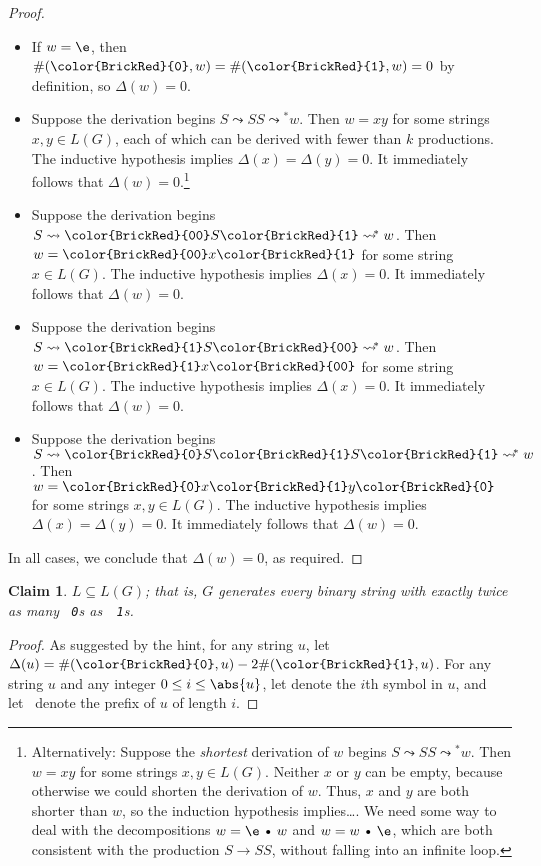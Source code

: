 \documentclass[11pt]{article}
\def\Cdot{\mathbin{\text{\normalfont \textbullet}}}
\def\Sym#1{\texttt{\upshape \color{BrickRed} {#1}}}
\def\To{\leadsto}
\def\Tostar{\mathrel{\To\!\!\!^*}}
\newtheorem{claim}{Claim}
\begin{document}
\begin{enumerate}
\begin{enumerate}
\begin{solution}
\begin{proof}
\begin{itemize}
\item
If $w = \e$, then $\#(\Sym0, w) = \#(\Sym1, w) = 0$ by definition, so $\Delta(w) = 0$.

\item
Suppose the derivation begins $S \To SS \Tostar w$.  Then $w = xy$ for some strings $x,y\in L(G)$, each of which can be derived with fewer than $k$ productions.   The inductive hypothesis implies $\Delta(x) =\Delta(y) = 0$.  It immediately follows that $\Delta(w)=0$.\footnote{Alternatively: Suppose the \emph{shortest} derivation of $w$ begins $S \To SS \Tostar w$. Then $w = xy$ for some strings $x,y\in L(G)$.  Neither $x$ or $y$ can be empty, because otherwise we could shorten the derivation of $w$.  Thus, $x$ and $y$ are both shorter than $w$, so the induction hypothesis implies\dots.  We need some way to deal with the decompositions $w=\e\Cdot w$ and $w=w\Cdot\e$, which are both consistent with the production $S\to SS$, without falling into an infinite loop.}

\item
Suppose the derivation begins $S \To \Sym{00}S\Sym1 \Tostar w$.  Then $w = \Sym{00}x\Sym1$ for some string $x\in L(G)$.  The inductive hypothesis implies $\Delta(x) = 0$.  It immediately follows that $\Delta(w)=0$.

\item
Suppose the derivation begins $S \To \Sym1 S\Sym{00} \Tostar w$.  Then  $w = \Sym1 x \Sym{00}$ for some string $x\in L(G)$.  The inductive hypothesis implies $\Delta(x) = 0$.  It immediately follows that $\Delta(w)=0$.

\item
Suppose the derivation begins $S \To \Sym0 S\Sym1S \Sym1 \Tostar w$.  Then  $w = \Sym0 x\Sym1 y \Sym0$ for some strings $x,y\in L(G)$.  The inductive hypothesis implies $\Delta(x) =\Delta(y) = 0$.  It immediately follows that $\Delta(w)=0$.

\end{itemize}
In all cases, we conclude that $\Delta(w)=0$, as required.
\end{proof}


\begin{claim}
$L \subseteq L(G)$; that is, $G$ generates every binary string with exactly twice as many \Sym0s as~\Sym1s.
\end{claim}

\begin{proof}
As suggested by the hint, for any string $u$, let $\Delta(u) = \#(\Sym0, u) - 2\#(\Sym1, u)$.  For any string $u$ and any integer $0\le i\le \abs{u}$, let  denote the $i$th symbol in $u$, and let~ denote the prefix of $u$ of length $i$.


\end{proof}
\end{solution}
\end{enumerate}
\end{enumerate}
\end{document}
